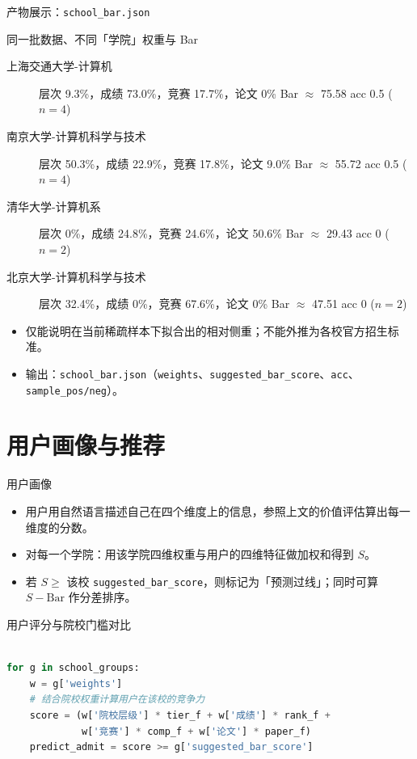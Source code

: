 \documentclass[10pt, aspectratio=169]{beamer}
\begin{document}
\begin{frame}{产物展示：\texttt{school\_bar.json}}
    \begin{block}{同一批数据、不同「学院」权重与 Bar}
        \scriptsize
        \begin{description}
            \item[上海交通大学-计算机] 层次 9.3\%，成绩 73.0\%，竞赛 17.7\%，论文 0\% \quad Bar $\approx$ 75.58 \quad acc 0.5 \quad ($n{=}4$)
            \item[南京大学-计算机科学与技术] 层次 50.3\%，成绩 22.9\%，竞赛 17.8\%，论文 9.0\% \quad Bar $\approx$ 55.72 \quad acc 0.5 \quad ($n{=}4$)
            \item[清华大学-计算机系] 层次 0\%，成绩 24.8\%，竞赛 24.6\%，论文 50.6\% \quad Bar $\approx$ 29.43 \quad acc 0 \quad ($n{=}2$)
            \item[北京大学-计算机科学与技术] 层次 32.4\%，成绩 0\%，竞赛 67.6\%，论文 0\% \quad Bar $\approx$ 47.51 \quad acc 0 \quad ($n{=}2$)
        \end{description}
    \end{block}
    \begin{itemize}
        \scriptsize
        \item 仅能说明在当前稀疏样本下拟合出的相对侧重；不能外推为各校官方招生标准。
        \item 输出：\texttt{school\_bar.json}（\texttt{weights}、\texttt{suggested\_bar\_score}、\texttt{acc}、\texttt{sample\_pos/neg}）。
    \end{itemize}
\end{frame}


\section{用户画像与推荐}

\begin{frame}[fragile]{用户画像}
    \small
    \begin{itemize}\setlength{\itemsep}{0.2em}
        \item 用户用自然语言描述自己在四个维度上的信息，参照上文的价值评估算出每一维度的分数。
        \item 对每一个学院：用该学院四维权重与用户的四维特征做加权和得到 $S$。
        \item 若 $S \ge$ 该校 \texttt{suggested\_bar\_score}，则标记为「预测过线」；同时可算 $S - \text{Bar}$ 作分差排序。
    \end{itemize}
    \vspace{0.25cm}
    \centering\footnotesize 用户评分与院校门槛对比
    \vspace{0.15cm}
    \begin{lstlisting}[language=Python, basicstyle=\ttfamily\scriptsize, frame=single, backgroundcolor=\color{gray!5}]

for g in school_groups:
    w = g['weights']
    # 结合院校权重计算用户在该校的竞争力
    score = (w['院校层级'] * tier_f + w['成绩'] * rank_f +
             w['竞赛'] * comp_f + w['论文'] * paper_f)
    predict_admit = score >= g['suggested_bar_score']
    \end{lstlisting}
\end{frame}
\end{document}
